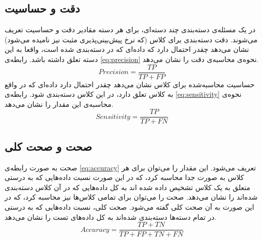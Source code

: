 \subsection{دقت و حساسیت}
در یک مسئله‌ی دسته‌بندی چند دسته‌ای، برای هر دسته مقادیر دقت و حساسیت تعریف می‌شوند. دقت دسته‌بندی برای کلاس  (که نرخ پیش‌بینی‌پذیری مثبت نیز نامیده می‌شود) نشان می‌دهد چقدر احتمال دارد که داده‌ای که در  دسته‌بندی شده است، واقعا به این دسته تعلق داشته باشد. رابطه‌ی \ref{eq:precision} نحوه‌ی محاسبه‌ی دقت را نشان می‌دهد.
\begin{equation}
	 Precision = \frac{TP}{TP+FP}
\label{eq:precision}
\end{equation}
حساسیت محاسبه‌شده برای کلاس  نشان می‌دهد چقدر احتمال دارد داده‌ای که در واقع به کلاس   تعلق دارد، در این کلاس دسته‌بندی شود. رابطه‌ی \ref{eq:sensitivity} نحوه‌ی محاسبه‌ی این مقدار را نشان می‌دهد.
\begin{equation}
	 Sensitivity = \frac{TP}{TP+FN}
\label{eq:sensitivity}
\end{equation}

\subsection{صحت و صحت کلی}
صحت به صورت رابطه‌ی \ref{eq:accuracy} تعریف می‌شود. این مقدار را می‌توان برای هر کلاس به صورت جدا محاسبه کرد، که در این صورت نسبت داده‌هایی که به درستی متعلق به یک کلاس تشخیص داده شده اند به کل داده‌هایی که در آن کلاس دسته‌بندی شده‌اند را نشان می‌دهد. صحت را می‌توان برای تمامی کلاس‌ها نیز محاسبه کرد، که در این صورت  به آن صحت کلی گفته می‌شود. صحت کلی، نسبت داده‌هایی که به درستی در تمام دسته‌ها دسته‌بندی شده‌اند به کل داده‌های تست را نشان می‌دهد.
\begin{equation}
	 Accuracy = \frac{TP+TN}{TP+FP+TN+FN}
\label{eq:accuracy}
\end{equation}